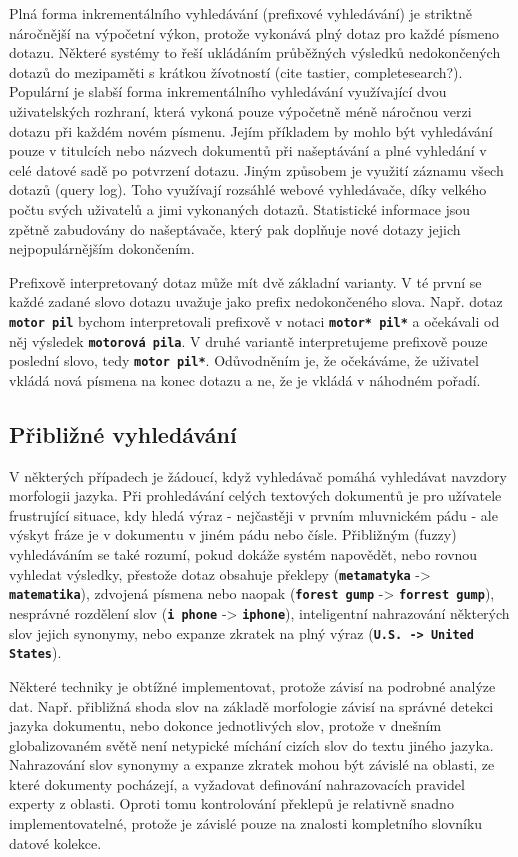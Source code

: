 \documentclass[11pt,letterpaper,oneside,openright]{book}
\newcommand{\bftt}[1]{\texttt{\textbf{#1}}}
\begin{document}
Plná forma inkrementálního vyhledávání (prefixové vyhledávání) je striktně
náročnější na výpočetní výkon, protože vykonává plný dotaz pro každé písmeno
dotazu. Některé systémy to řeší ukládáním průběžných výsledků nedokončených
dotazů do mezipaměti s krátkou žívotností (cite tastier, completesearch?).
Populární je slabší forma inkrementálního vyhledávání využívající dvou
uživatelských rozhraní, která vykoná pouze výpočetně méně náročnou verzi dotazu
při každém novém písmenu.  Jejím příkladem by mohlo být vyhledávání pouze v
titulcích nebo názvech dokumentů při našeptávání a plné vyhledání v celé datové
sadě po potvrzení dotazu.  Jiným způsobem je využití záznamu všech dotazů
(query log). Toho využívají rozsáhlé webové vyhledávače, díky velkého počtu
svých uživatelů a jimi vykonaných dotazů. Statistické informace jsou zpětně
zabudovány do našeptávače, který pak doplňuje nové dotazy jejich
nejpopulárnějším dokončením.

Prefixově interpretovaný dotaz může mít dvě základní varianty. V té první se
každé zadané slovo dotazu uvažuje jako prefix nedokončeného slova. Např. dotaz
\bftt{motor pil} bychom interpretovali prefixově v notaci \bftt{motor* pil*} a
očekávali od něj výsledek \bftt{motorová pila}. V druhé variantě interpretujeme
prefixově pouze poslední slovo, tedy \bftt{motor pil*}. Odůvodněním je, že
očekáváme, že uživatel vkládá nová písmena na konec dotazu a ne, že je vkládá
v náhodném pořadí.

\subsection{Přibližné vyhledávání}
V některých případech je žádoucí, když vyhledávač pomáhá vyhledávat navzdory
morfologii jazyka. Při prohledávání celých textových dokumentů je pro užívatele
frustrující situace, kdy hledá výraz - nejčastěji v prvním mluvnickém pádu -
ale výskyt fráze je v dokumentu v jiném pádu nebo čísle. Přibližným (fuzzy)
vyhledáváním se také rozumí, pokud dokáže systém napovědět, nebo rovnou
vyhledat výsledky, přestože dotaz obsahuje překlepy (\bftt{metamatyka} ->
\bftt{matematika}), zdvojená písmena nebo naopak (\bftt{forest gump} ->
\bftt{forrest gump}), nesprávné rozdělení slov (\bftt{i phone} ->
\bftt{iphone}), inteligentní nahrazování některých slov jejich synonymy, nebo
expanze zkratek na plný výraz (\bftt{U.S. -> United States}).

Některé techniky je obtížné implementovat, protože závisí na podrobné analýze
dat. Např. přibližná shoda slov na základě morfologie závisí na správné detekci
jazyka dokumentu, nebo dokonce jednotlivých slov, protože v dnešním
globalizovaném světě není netypické míchání cizích slov do textu jiného jazyka.
Nahrazování slov synonymy a expanze zkratek mohou být závislé na oblasti, ze
které dokumenty pocházejí, a vyžadovat definování nahrazovacích pravidel
experty z oblasti. Oproti tomu kontrolování překlepů je relativně snadno
implementovatelné, protože je závislé pouze na znalosti kompletního slovníku
datové kolekce.
\end{document}
